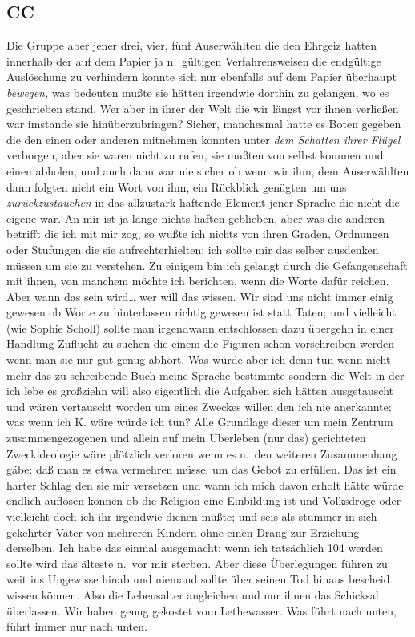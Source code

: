 \documentclass[
]{article}
\author{}
\date{\vspace{-2.5em}}
\begin{document}
\subsection{CC}\label{cc}

Die Gruppe aber jener drei, vier, fünf Auserwählten die den Ehrgeiz
hatten innerhalb der auf dem Papier ja n.~gültigen Verfahrensweisen die
endgültige Auslöschung zu verhindern konnte sich nur ebenfalls auf dem
Papier überhaupt \emph{bewegen,} was bedeuten mußte sie hätten irgendwie
dorthin zu gelangen, wo es geschrieben stand. Wer aber in ihrer der Welt
die wir längst vor ihnen verließen war imstande sie hinüberzubringen?
Sicher, manchesmal hatte es Boten gegeben die den einen oder anderen
mitnehmen konnten unter \emph{dem Schatten ihrer Flügel} verborgen, aber
sie waren nicht zu rufen, sie mußten von selbst kommen und einen
abholen; und auch dann war nie sicher ob wenn wir ihm, dem Auserwählten
dann folgten nicht ein Wort von ihm, ein Rückblick genügten um uns
\emph{zurückzustauchen} in das allzustark haftende Element jener Sprache
die nicht die eigene war. An mir ist ja lange nichts haften geblieben,
aber was die anderen betrifft die ich mit mir zog, so wußte ich nichts
von ihren Graden, Ordnungen oder Stufungen die sie aufrechterhielten;
ich sollte mir das selber ausdenken müssen um sie zu verstehen. Zu
einigem bin ich gelangt durch die Gefangenschaft mit ihnen, von manchem
möchte ich berichten, wenn die Worte dafür reichen. Aber wann das sein
wird\ldots{} wer will das wissen. Wir sind uns nicht immer einig gewesen
ob Worte zu hinterlassen richtig gewesen ist statt Taten; und vielleicht
(wie Sophie Scholl) sollte man irgendwann entschlossen dazu übergehn in
einer Handlung Zuflucht zu suchen die einem die Figuren schon
vorschreiben werden wenn man sie nur gut genug abhört. Was würde aber
ich denn tun wenn nicht mehr das zu schreibende Buch meine Sprache
bestimmte sondern die Welt in der ich lebe es großziehn will also
eigentlich die Aufgaben sich hätten ausgetauscht und wären vertauscht
worden um eines Zweckes willen den ich nie anerkannte; was wenn ich K.
wäre würde ich tun? Alle Grundlage dieser um mein Zentrum
zusammengezogenen und allein auf mein Überleben (nur das) gerichteten
Zweckideologie wäre plötzlich verloren wenn es n.~den weiteren
Zusammenhang gäbe: daß man es etwa vermehren müsse, um das Gebot zu
erfüllen. Das ist ein harter Schlag den sie mir versetzen und wann ich
mich davon erholt hätte würde endlich auflösen können ob die Religion
eine Einbildung ist und Volksdroge oder vielleicht doch ich ihr
irgendwie dienen müßte; und seis als stummer in sich gekehrter Vater von
mehreren Kindern ohne einen Drang zur Erziehung derselben. Ich habe das
einmal ausgemacht; wenn ich tatsächlich 104 werden sollte wird das
älteste n.~vor mir sterben. Aber diese Überlegungen führen zu weit ins
Ungewisse hinab und niemand sollte über seinen Tod hinaus bescheid
wissen können. Also die Lebensalter angleichen und nur ihnen das
Schicksal überlassen. Wir haben genug gekostet vom Lethewasser. Was
führt nach unten, führt immer nur nach unten.
\end{document}
